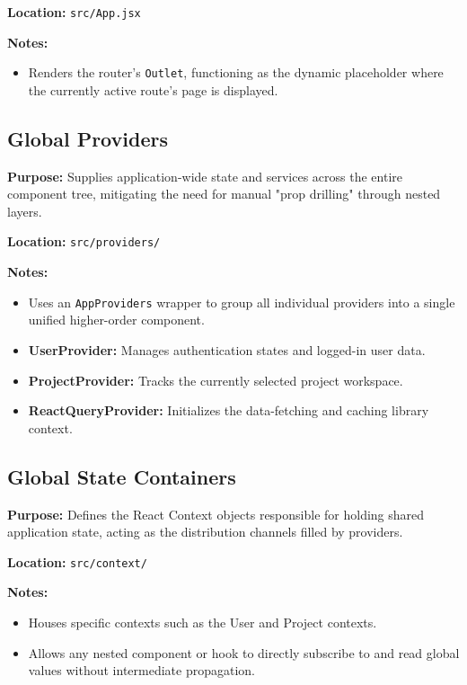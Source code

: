 \vspace{0.2cm}
\noindent\textbf{Location:} \texttt{src/App.jsx}

\vspace{0.2cm}
\noindent\textbf{Notes:}
\begin{itemize}
    \item Renders the router's \texttt{Outlet}, functioning as the dynamic placeholder where the currently active route's page is displayed.
\end{itemize}

\subsection{Global Providers}

\textbf{Purpose:} Supplies application-wide state and services across the entire component tree, mitigating the need for manual "prop drilling" through nested layers.

\vspace{0.2cm}
\noindent\textbf{Location:} \texttt{src/providers/}

\vspace{0.2cm}
\noindent\textbf{Notes:}
\begin{itemize}
    \item Uses an \texttt{AppProviders} wrapper to group all individual providers into a single unified higher-order component.
    \item \textbf{UserProvider:} Manages authentication states and logged-in user data.
    \item \textbf{ProjectProvider:} Tracks the currently selected project workspace.
    \item \textbf{ReactQueryProvider:} Initializes the data-fetching and caching library context.
\end{itemize}

\subsection{Global State Containers}

\textbf{Purpose:} Defines the React Context objects responsible for holding shared application state, acting as the distribution channels filled by providers.

\vspace{0.2cm}
\noindent\textbf{Location:} \texttt{src/context/}

\vspace{0.2cm}
\noindent\textbf{Notes:}
\begin{itemize}
    \item Houses specific contexts such as the User and Project contexts.
    \item Allows any nested component or hook to directly subscribe to and read global values without intermediate propagation.
\end{itemize}

